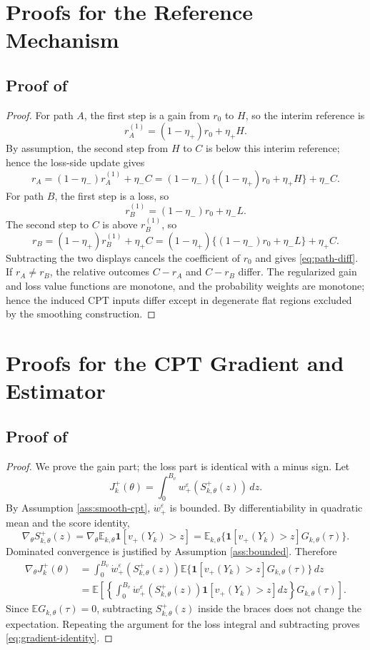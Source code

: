\documentclass[11pt]{article}
\newcommand{\E}{\mathbb E}
\newcommand{\1}{\mathbf 1}
\newcommand{\CPT}{\ensuremath{\mathrm{CPT}}\xspace}
\newcommand{\eps}{\varepsilon}
\newcommand{\etaP}{\eta_{+}}
\newcommand{\etaM}{\eta_{-}}
\begin{document}
\section{Proofs for the Reference Mechanism}\label{app:reference-proofs}

\subsection{Proof of }
\begin{proof}
For path $A$, the first step is a gain from $r_0$ to $H$, so the interim reference is
\[
 r_A^{(1)}=(1-\etaP)r_0+\etaP H.
\]
By assumption, the second step from $H$ to $C$ is below this interim reference; hence the loss-side update gives
\[
 r_A=(1-\etaM)r_A^{(1)}+\etaM C
 =(1-\etaM)\{(1-\etaP)r_0+\etaP H\}+\etaM C.
\]
For path $B$, the first step is a loss, so
\[
 r_B^{(1)}=(1-\etaM)r_0+\etaM L.
\]
The second step to $C$ is above $r_B^{(1)}$, so
\[
 r_B=(1-\etaP)r_B^{(1)}+\etaP C
 =(1-\etaP)\{(1-\etaM)r_0+\etaM L\}+\etaP C.
\]
Subtracting the two displays cancels the coefficient of $r_0$ and gives \eqref{eq:path-diff}.  If $r_A\ne r_B$, the relative outcomes $C-r_A$ and $C-r_B$ differ.  The regularized gain and loss value functions are monotone, and the probability weights are monotone; hence the induced \CPT inputs differ except in degenerate flat regions excluded by the smoothing construction.
\end{proof}

\section{Proofs for the CPT Gradient and Estimator}\label{app:estimator-proofs}

\subsection{Proof of }
\begin{proof}
We prove the gain part; the loss part is identical with a minus sign.  Let
\[
 J_k^+(\theta)=\int_0^{B_v} w_+^\eps(S^+_{k,\theta}(z))\,dz.
\]
By Assumption \ref{ass:smooth-cpt}, $\dot w_+^\eps$ is bounded.  By differentiability in quadratic mean and the score identity,
\[
 \nabla_\theta S^+_{k,\theta}(z)
 =\nabla_\theta \E_{k,\theta}\1[v_+(Y_k)>z]
 =\E_{k,\theta}\{\1[v_+(Y_k)>z]G_{k,\theta}(\tau)\}.
\]
Dominated convergence is justified by Assumption \ref{ass:bounded}.  Therefore
\begin{align*}
 \nabla_\theta J_k^+(\theta)
 &=\int_0^{B_v}\dot w_+^\eps(S^+_{k,\theta}(z))
 \E\{\1[v_+(Y_k)>z]G_{k,\theta}(\tau)\}\,dz\\
 &=\E\left[\left\{\int_0^{B_v}\dot w_+^\eps(S^+_{k,\theta}(z))\1[v_+(Y_k)>z]dz\right\}G_{k,\theta}(\tau)\right].
\end{align*}
Since $\E G_{k,\theta}(\tau)=0$, subtracting $S^+_{k,\theta}(z)$ inside the braces does not change the expectation.  Repeating the argument for the loss integral and subtracting proves \eqref{eq:gradient-identity}.
\end{proof}
\end{document}
